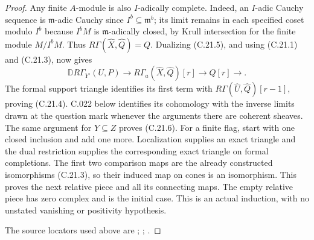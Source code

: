 \begin{proof}
Any finite $A$-module is also $I$-adically complete. Indeed,
an $I$-adic Cauchy sequence is $\mathfrak m$-adic Cauchy since
$I^b\subseteq\mathfrak m^b$; its limit remains in each specified
coset modulo $I^b$ because $I^bM$ is $\mathfrak m$-adically
closed, by Krull intersection for the finite module $M/I^bM$.
Thus $R\Gamma(\widehat X,\widehat Q)=Q$.
Dualizing (C.21.5), and using (C.21.1) and (C.21.3), now gives
\[
 \mathbb D R\Gamma_{Y'}(U,P)\longrightarrow
 R\Gamma_a(\widehat X,\widehat Q)[r]\longrightarrow Q[r]
 \longrightarrow.
\]
The formal support triangle identifies its first term with
$R\Gamma(\widehat U,\widehat Q)[r-1]$, proving (C.21.4).
C.022 below identifies its cohomology with the inverse limits
drawn at the question mark whenever the arguments there are
coherent sheaves. The same argument for $Y\subseteq Z$ proves
(C.21.6). For a finite flag, start with one closed inclusion and
add one more. Localization supplies an exact triangle and the
dual restriction supplies the corresponding exact triangle on
formal completions. The first two comparison maps are the
already constructed isomorphisms (C.21.3), so their induced map
on cones is an isomorphism. This proves the next relative piece
and all its connecting maps. The empty relative piece has zero
complex and is the initial case. This is an actual induction,
with no unstated vanishing or positivity hypothesis.

The source locators used above are \cite[47.18.3--47.18.4, 48.2.5, 47.12.3]{C-stacks}; \cite[XIII, Section~1 after Problem~1.4, p.~139]{C-sga2}; \cite[1.2]{C-szpiro1976}.
\end{proof}

